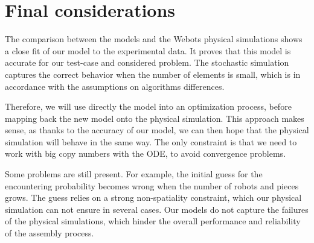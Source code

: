 		
	

\section{Final considerations} %
\label{sec:final_considerations}
	
	The comparison between the models and the Webots physical simulations shows a close fit of our model to the experimental data. It proves that this model is accurate for our test-case and considered problem. The stochastic simulation captures the correct behavior when the number of elements is small, which is in accordance with the assumptions on algorithms differences.
	
	Therefore, we will use directly the model into an optimization process, before mapping back the new model onto the physical simulation. This approach makes sense, as thanks to the accuracy of our model, we can then hope that the physical simulation will behave in the same way. The only constraint is that we need to work with big copy numbers with the ODE, to avoid convergence problems.
	
	Some problems are still present.
	For example, the initial guess for the encountering probability becomes wrong when the number of robots and pieces grows. The guess relies on a strong non-spatiality constraint, which our physical simulation can not ensure in several cases. Our models do not capture the failures of the physical simulations, which hinder the overall performance and reliability of the assembly process. 
